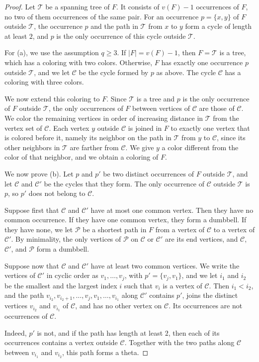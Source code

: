 \begin{proof}
Let $\mathcal T$ be a spanning tree of $F$. It consists of $v(F) - 1$ occurrences of $F$, no two of them occurrences of the same pair. For an occurrence $p = \{x, y\}$ of $F$ outside $\mathcal T$, the occurrence $p$ and the path in $\mathcal T$ from $x$ to $y$ form a cycle of length at least $2$, and $p$ is the only occurrence of this cycle outside $\mathcal T$.

For (a), we use the assumption $q \ge 3$. If $|F| = v(F) - 1$, then $F = \mathcal T$ is a tree, which has a coloring with two colors. Otherwise, $F$ has exactly one occurrence $p$ outside $\mathcal T$, and we let $\mathcal C$ be the cycle formed by $p$ as above. The cycle $\mathcal C$ has a coloring with three colors.

We now extend this coloring to $F$. Since $\mathcal T$ is a tree and $p$ is the only occurrence of $F$ outside $\mathcal T$, the only occurrences of $F$ between vertices of $\mathcal C$ are those of $\mathcal C$. We color the remaining vertices in order of increasing distance in $\mathcal T$ from the vertex set of $\mathcal C$. Each vertex $y$ outside $\mathcal C$ is joined in $F$ to exactly one vertex that is colored before it, namely its neighbor on the path in $\mathcal T$ from $y$ to $\mathcal C$, since its other neighbors in $\mathcal T$ are farther from $\mathcal C$. We give $y$ a color different from the color of that neighbor, and we obtain a coloring of $F$.

We now prove (b). Let $p$ and $p'$ be two distinct occurrences of $F$ outside $\mathcal T$, and let $\mathcal C$ and $\mathcal C'$ be the cycles that they form. The only occurrence of $\mathcal C$ outside $\mathcal T$ is $p$, so $p'$ does not belong to $\mathcal C$.

Suppose first that $\mathcal C$ and $\mathcal C'$ have at most one common vertex. Then they have no common occurrence. If they have one common vertex, they form a dumbbell. If they have none, we let $\mathcal P$ be a shortest path in $F$ from a vertex of $\mathcal C$ to a vertex of $\mathcal C'$. By minimality, the only vertices of $\mathcal P$ on $\mathcal C$ or $\mathcal C'$ are its end vertices, and $\mathcal C$, $\mathcal C'$, and $\mathcal P$ form a dumbbell.

Suppose now that $\mathcal C$ and $\mathcal C'$ have at least two common vertices. We write the vertices of $\mathcal C'$ in cyclic order as $v_1, \dots, v_j$, with $p' = \{v_j, v_1\}$, and we let $i_1$ and $i_2$ be the smallest and the largest index $i$ such that $v_i$ is a vertex of $\mathcal C$. Then $i_1 < i_2$, and the path $v_{i_2}, v_{i_2 + 1}, \dots, v_j, v_1, \dots, v_{i_1}$ along $\mathcal C'$ contains $p'$, joins the distinct vertices $v_{i_2}$ and $v_{i_1}$ of $\mathcal C$, and has no other vertex on $\mathcal C$. Its occurrences are not occurrences of $\mathcal C$.

Indeed, $p'$ is not, and if the path has length at least $2$, then each of its occurrences contains a vertex outside $\mathcal C$. Together with the two paths along $\mathcal C$ between $v_{i_1}$ and $v_{i_2}$, this path forms a theta.
\end{proof}

